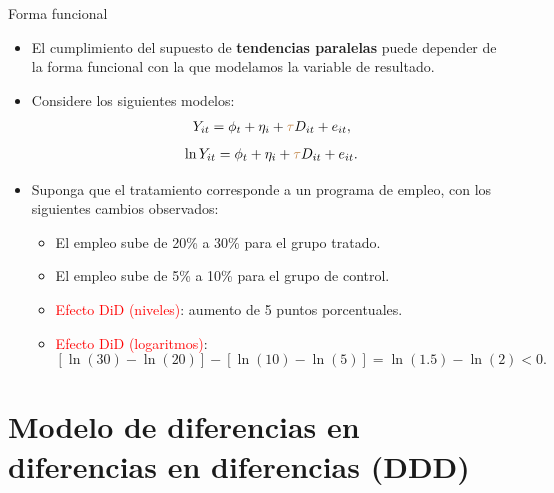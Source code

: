 \documentclass[10pt, xcolor=dvipsnames]{beamer}
\begin{document}
\begin{frame}{Forma funcional}
\begin{itemize}
	\item El cumplimiento del supuesto de \textbf{tendencias paralelas} puede depender de la forma funcional con la que modelamos la variable de resultado.
	\smallspace
	\item Considere los siguientes modelos:
	\begin{align*}
	Y_{it} = \phi_t + \eta_i + \textcolor{brown}{\tau} D_{it} + e_{it},
	\end{align*}
	\vspace{-2em}
	\begin{align*}
	\ln Y_{it} = \phi_t + \eta_i + \textcolor{brown}{\tau} D_{it} + e_{it}.
	\end{align*}
	\vspace{-0.5cm}
	\item Suponga que el tratamiento corresponde a un programa de empleo, con los siguientes cambios observados:
	\smallspace
    \begin{itemize}
        \item El empleo sube de 20\% a 30\% para el grupo tratado.
        \item El empleo sube de 5\% a 10\% para el grupo de control. %
        \item \textcolor{red}{Efecto DiD (niveles)}: aumento de 5 puntos porcentuales. %
        \item \textcolor{red}{Efecto DiD (logaritmos)}: 
        \[
        [\ln(30) - \ln(20)] - [\ln(10) - \ln(5)] = \ln(1.5) - \ln(2) < 0.
        \]
    \end{itemize}    
\end{itemize}
\end{frame}

\section{Modelo de diferencias en diferencias en diferencias (DDD)}
\end{document}
